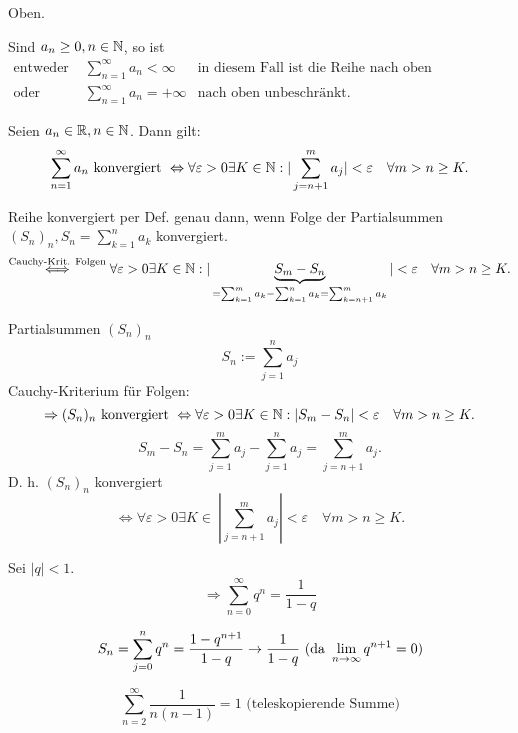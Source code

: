\begin{bew}
	Oben.
\end{bew}
\begin{kor}
	Sind \(a_n \geq 0, n\in \mathbb{N} \), so ist
	\begin{align*}
		\text{entweder } &\sum_{n=1}^{\infty}a_n < \infty &\text{in diesem Fall ist die Reihe nach oben beschränkt.}\\
		\text{oder } &\sum_{n=1}^{\infty}a_n = +\infty &\text{nach oben unbeschränkt.}
	\end{align*}
\end{kor}
\begin{satz}
	Seien \(a_n \in\mathbb{R}, n\in\mathbb{N}\). Dann gilt: 
	\[ \sum_{n=1}^{\infty} a_n \text{ konvergiert } \Leftrightarrow \forall \varepsilon >0 \exists K \in \mathbb{N} : | \sum_{j=n+1}^{m}a_j|<\varepsilon \quad \forall m>n\geq K.\]
\end{satz}
\begin{bew}%
	Reihe konvergiert per Def. genau dann, wenn Folge der Partialsummen \( (S_n)_n, S_n = \sum_{k=1}^{n}a_k \) konvergiert.
	\[ \overset{\text{Cauchy-Krit. Folgen}}{\Longleftrightarrow} \forall \varepsilon > 0 \exists K\in\mathbb{N}: |\underbrace{S_m-S_n}_{=\sum_{k=1}^{m}a_k-\sum_{k=1}^{n}a_k=\sum_{k=n+1}^{m}a_k}|<\varepsilon \quad \forall m>n\geq K. \]
\end{bew}
\begin{bew}%
	Partialsummen \((S_n)_n\)
	\[ S_n := \sum_{j=1}^{n} a_j \]
	Cauchy-Kriterium  für Folgen:
	\[ \Rightarrow (S_n)_n \text{ konvergiert } \Leftrightarrow \forall \varepsilon > 0 \exists K\in\mathbb{N}:|S_m-S_n|<\varepsilon \quad \forall m>n\geq K. \]
	\[ S_m - S_n = \sum_{j=1}^{m}a_j - \sum_{j=1}^{n} a_j = \sum_{j=n+1}^{m} a_j. \]
	D. h. \((S_n)_n\) konvergiert \[ \Leftrightarrow \forall \varepsilon > 0 \exists K\in\: |\sum_{j=n+1}^{m}a_j|<\varepsilon \quad \forall m>n\geq K. \]
\end{bew}
\begin{bsp}
	Sei \(|q|<1\).
	\[ \Rightarrow \sum_{n=0}^{\infty} q^n = \frac{1}{1-q} \]
\end{bsp}
\begin{bsp}
	\[S_n = \sum_{j=0}^{n} q^n = \frac{1-q^{n+1}}{1-q} \rightarrow \frac{1}{1-q} \text{ (da } \lim\limits_{n\rightarrow\infty}q^{n+1}=0 \text{)} \]
\end{bsp}
\begin{bsp}
	\[\sum_{n=2}^{\infty}\frac{1}{n(n-1)}=1 \text{ (teleskopierende Summe)} \]
\end{bsp}
